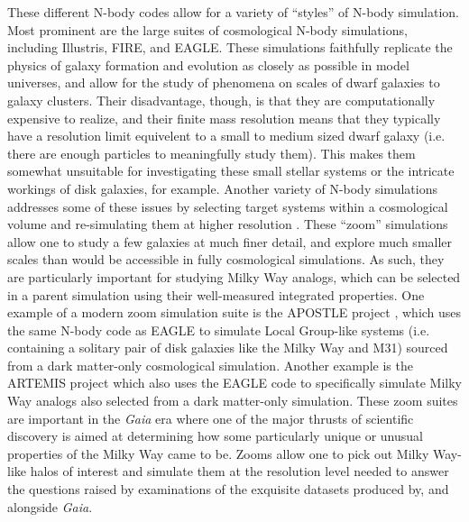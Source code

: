 These different N-body codes allow for a variety of ``styles'' of N-body simulation. Most prominent are the large suites of cosmological N-body simulations, including Illustris, FIRE, and EAGLE. These simulations faithfully replicate the physics of galaxy formation and evolution as closely as possible in model universes, and allow for the study of phenomena on scales of dwarf galaxies to galaxy clusters. Their disadvantage, though, is that they are computationally expensive to realize, and their finite mass resolution means that they typically have a resolution limit equivelent to a small to medium sized dwarf galaxy (i.e. there are enough particles to meaningfully study them). This makes them somewhat unsuitable for investigating these small stellar systems or the intricate workings of disk galaxies, for example. Another variety of N-body simulations addresses some of these issues by selecting target systems within a cosmological volume and re-simulating them at higher resolution \parencite[i.e. by upsampling the initial conditions, see ][]{bertschinger01,jenkins10}. These ``zoom'' simulations allow one to study a few galaxies at much finer detail, and explore much smaller scales than would be accessible in fully cosmological simulations. As such, they are particularly important for studying Milky Way analogs, which can be selected in a parent simulation using their well-measured integrated properties. One example of a modern zoom simulation suite is the APOSTLE project \parencite{apostle_sawala16}, which uses the same N-body code as EAGLE to simulate Local Group-like systems (i.e. containing a solitary pair of disk galaxies like the Milky Way and M31) sourced from a dark matter-only cosmological simulation. Another example is the ARTEMIS project \parencite{font20} which also uses the EAGLE code to specifically simulate Milky Way analogs also selected from a dark matter-only simulation. These zoom suites are important in the \textit{Gaia} era where one of the major thrusts of scientific discovery is aimed at determining how some particularly unique or unusual properties of the Milky Way came to be. Zooms allow one to pick out Milky Way-like halos of interest and simulate them at the resolution level needed to answer the questions raised by examinations of the exquisite datasets produced by, and alongside \textit{Gaia}.

